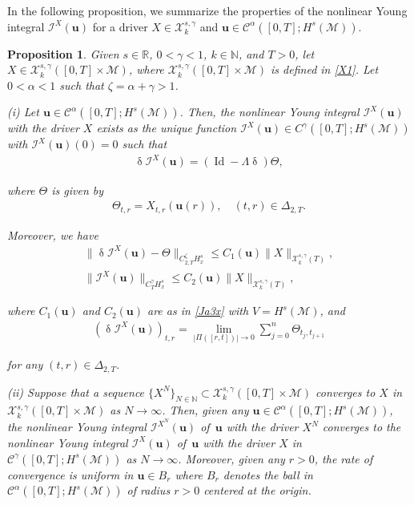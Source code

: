 \documentclass[letterpaper, 11pt,  reqno]{amsart}
\newtheorem{proposition}[theorem]{Proposition}
\DeclareMathOperator{\Id}{Id}
\newcommand{\1}{\hspace{0.5mm}\text{I}\hspace{0.5mm}}
\newcommand{\I}{\mathcal{I}}
\newcommand{\noi}{\noindent}
\newcommand{\R}{\mathbb{R}}
\newcommand{\CC}{\mathcal{C}}
\newcommand{\al}{\alpha}
\newcommand{\updl}{\updelta}
\newcommand{\Dl}{\Delta}
\newcommand{\g}{\gamma}
\newcommand{\M}{\mathcal{M}}
\newcommand{\N}{\mathbb{N}}
\newcommand{\cX}{\mathcal{X}}
\newcommand{\uu}{\mathbf{u}}
\newcommand{\z}{\zeta}
\newcommand{\Ta}{\Theta}
\numberwithin{equation}{section}
\numberwithin{theorem}{section}
\begin{document}
In the following proposition, 
we summarize
the properties
of the nonlinear Young integral
$\I^X(\uu)$
for a driver 
 $X\in \cX^{s, \g}_k$
 and $\uu \in  \CC^{\al}([0,T]; H^s(\M))$. 






\begin{proposition}\label{PROP:young1}
Given   $s \in \R$, $0 < \g < 1$,  $k \in \N$, and $T >0$, 
let   $X \in \cX^{s, \g}_k([0, T]\times \M)$, 
where $ \cX^{s, \g}_k([0, T]\times \M)$ is  defined  in \eqref{X1}.
Let
$0 < \al < 1$
such that 
 $\z  = \al + \g > 1$.





\smallskip

\noi
\textup{(i)}
Let  
  $\uu \in \CC^{\al}([0,T];H^s(\M))$.
 Then, the nonlinear Young integral $\I^X(\uu)$
 with the driver $X$ exists
 as the unique function  
$\I^X(\uu)\in C^\g([0,T]; H^s(\M))$
 with $\I^X(\uu)(0) = 0$
 such that 
 \begin{align}
\updl \I^X(\uu) = (\Id - \Lambda \updl)\Theta, 
\label{Y1}
\end{align}

 
\noi
where $\Ta$ is given by   
\begin{align*}
\Theta_{t,r} = X_{t,r}(\uu(r)), \quad (t,r)\in \Dl_{2,T}.
\end{align*}

\noi
Moreover, we have
\begin{align}
\label{Y2}
\|\updl \I^X(\uu) - \Theta\|_{C^\z_{2,T} H^s_x}
\le
C_1(\uu)\|X\|_{\cX^{s, \g}_k(T)},\\
\label{Y3}
\|\I^X(\uu)\|_{C^\g_T  H^s_x} 
\le
C_2(\uu)\|X\|_{\cX^{s, \g}_k(T)}, 
\end{align}


\noi
where $C_1(\uu)$ and $C_2(\uu)$ are as in \eqref{Ja3x}
with $V = H^s(\M)$, 
and 
\begin{align*}
(\updl \I^X(\uu))_{t,r} = \lim_{|\Pi([r,t])|\to 0} 
\sum^n_{j=0} \Theta_{t_j,t_{j+1}}
\end{align*} 


\noi
for any  $(t,r)\in \Dl_{2,T}$.


\smallskip

\noi
\textup{(ii)}
Suppose that a sequence $\{X^N\}_{N \in \N}\subset 
 \cX^{s, \g}_k([0, T]\times \M)$
 converges to $X$ in 
 $ \cX^{s, \g}_k([0, T]\times \M)$ as $N \to \infty$.
Then, given
any  $\uu \in \CC^{\al}([0,T];H^s(\M))$, 
 the nonlinear Young integral $\I^{X^N}(\uu)$
 of~$\uu$ 
 with the driver $X^N$ 
 converges to 
 the nonlinear Young integral $\I^X(\uu)$
 of~$\uu$ 
 with the driver $X$ 
 in $\CC^\g([0, T]; H^s(\M))$
as $N \to \infty$.
Moreover, 
given any $r > 0$, 
the rate of convergence is
uniform in $\uu \in B_r$ 
where
$B_r$ denotes the ball 
in $\CC^{\al}([0,T];H^s(\M))$
of radius $r > 0$ centered at the origin.


\end{proposition}
\end{document}
